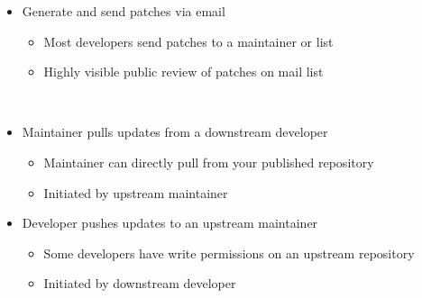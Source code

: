 \documentclass[draftclsnofoot,journal,onecolumn,12pt]{IEEEtran}
\begin{document}
\begin{itemize}
  \item Generate and send patches via email
    \begin{itemize}
      \item Most developers send patches to a maintainer or list
      \item Highly visible public review of patches on mail list
    \end{itemize}
\item Maintainer pulls updates from a downstream developer
    \begin{itemize}
      \item Maintainer can directly pull from your published repository
      \item Initiated by upstream maintainer
    \end{itemize}
  \item Developer pushes updates to an upstream maintainer
    \begin{itemize}
      \item Some developers have write permissions on an upstream repository
      \item Initiated by downstream developer
    \end{itemize}
\end{itemize}
\end{document}

